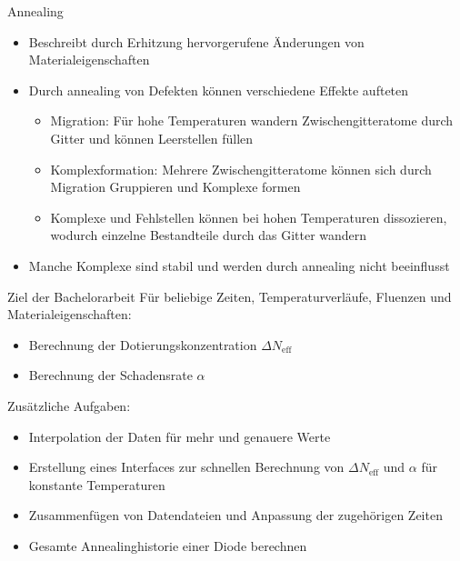 \documentclass[aspectratio=1610, 9pt]{beamer}
\begin{document}
\begin{frame}{Annealing}
  \begin{itemize}
    \item Beschreibt durch Erhitzung hervorgerufene Änderungen von Materialeigenschaften
    \medskip
    \item Durch annealing von Defekten können verschiedene Effekte aufteten
      \begin{itemize}
        \item Migration: Für hohe Temperaturen wandern Zwischengitteratome durch Gitter und
        können Leerstellen füllen
        \medskip
        \item Komplexformation: Mehrere Zwischengitteratome können sich durch Migration Gruppieren und Komplexe formen
        \medskip
        \item Komplexe und Fehlstellen können bei hohen Temperaturen dissozieren, wodurch einzelne Bestandteile durch das Gitter wandern
      \end{itemize}
    \medskip
    \item Manche Komplexe sind stabil und werden durch annealing nicht beeinflusst
  \end{itemize}
\end{frame}


\begin{frame}{Ziel der Bachelorarbeit}
  Für beliebige Zeiten, Temperaturverläufe, Fluenzen und Materialeigenschaften:
  \begin{itemize}
    \item Berechnung der Dotierungskonzentration $\Delta N_{\mathrm{eff}}$
    \item Berechnung der Schadensrate $\alpha$
  \end{itemize}
  \medskip

  Zusätzliche Aufgaben:
  \begin{itemize}
    \item Interpolation der Daten für mehr und genauere Werte
    \item Erstellung eines Interfaces zur schnellen Berechnung von $\Delta N_{\mathrm{eff}}$ und $\alpha$
    für konstante Temperaturen
    \item Zusammenfügen von Datendateien und Anpassung der zugehörigen Zeiten
    \item Gesamte Annealinghistorie einer Diode berechnen
  \end{itemize}
\end{frame}
\end{document}
